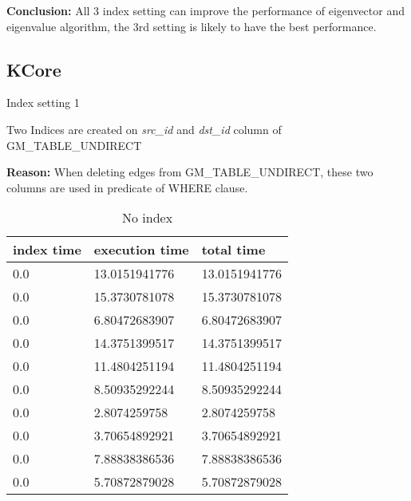 \par \textbf{Conclusion:} All 3 index setting can improve the performance of eigenvector and eigenvalue algorithm, the 3rd setting is likely to have the best performance.

\subsection{KCore}
\begin{itemize*}
\item{Index setting 1}
\par Two Indices are created on \textit{src\_id} and \textit{dst\_id} column of GM\_TABLE\_UNDIRECT
\par \textbf{Reason:} When deleting edges from GM\_TABLE\_UNDIRECT, these two columns are used in predicate of WHERE clause.

\begin{table}[H]
\begin{center}
\begin{tabular}{|l|l|l|}
\hline
index time & execution time & total time     \\ \hline
0.0 & 13.0151941776 & 13.0151941776 \\ \hline
0.0 & 15.3730781078 & 15.3730781078 \\ \hline
0.0 & 6.80472683907 & 6.80472683907 \\ \hline
0.0 & 14.3751399517 & 14.3751399517 \\ \hline
0.0 & 11.4804251194 & 11.4804251194 \\ \hline
0.0 & 8.50935292244 & 8.50935292244 \\ \hline
0.0 & 2.8074259758 & 2.8074259758 \\ \hline
0.0 & 3.70654892921 & 3.70654892921 \\ \hline
0.0 & 7.88838386536 & 7.88838386536 \\ \hline
0.0 & 5.70872879028 & 5.70872879028 \\ \hline
\end{tabular}
\end{center}
\caption{No index}
\end{table}


\end{itemize*}
